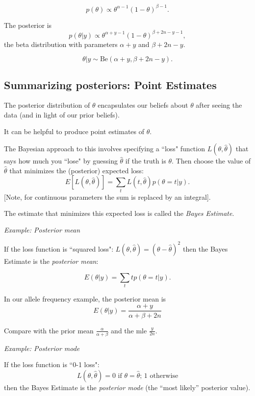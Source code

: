 $$p\left( \theta  \right) \propto \theta ^{\alpha  - 1} \left( {1 - \theta }
\right)^{\beta  - 1}.$$

The posterior is  
$$p\left( {\left. \theta  \right|y} \right) \propto \theta ^{\alpha  + y - 1}
\left( {1 - \theta } \right)^{\beta  + 2n - y - 1},$$
 the beta distribution with parameters $\alpha  + y$
 and $\beta  + 2n - y$.
 
 $$\theta | y \sim \text{Be}(\alpha+y, \beta + 2n -y).$$

\es\bs

 \subsection*{Summarizing posteriors: Point Estimates}

The posterior distribution of $\theta $ encapsulates our
beliefs about $\theta $ after seeing the data (and in light of our prior beliefs). 

It can be helpful to produce point estimates of $\theta$. 

The Bayesian approach to this involves specifying a ``loss" function
$L(\theta,\hat{\theta})$ that says how much you ``lose" by guessing
$\hat{\theta}$ if the truth is $\theta$. Then choose the value of $\hat{\theta}$ that
minimizes the (posterior) expected loss:
$$E[L(\theta,\hat{\theta})] = \sum_t L(t,\hat{\theta}) p(\theta= t | y).$$
[Note, for continuous parameters the sum is replaced by an integral].

The estimate that minimizes this expected loss is called the {\it Bayes Estimate}.
\es\bs

{\color{section0}\em Example: Posterior mean}

If the loss function is ``squared loss": $L(\theta,\hat{\theta}) = (\theta-\hat{\theta})^2$
then the Bayes Estimate is the {\em posterior mean}:

$$E( \theta |y ) = \sum_t t p(\theta=t  |y).$$

In our allele frequency example, the posterior mean is
$$E\left( {\left. \theta  \right|y} \right) = \frac{{\alpha  + y}}{{\alpha  + \beta  + 2n}}$$

Compare with the prior mean $\frac{\alpha }{{\alpha  + \beta }}$
 and the mle $\frac{y}{2n}.$
    \es\bs

{\color{section0}\em Example: Posterior mode}

If the loss function is ``0-1 loss": 
$$L(\theta,\hat{\theta}) = 0 \text{ if $\theta = \hat{\theta}$; 1 otherwise}$$
then the Bayes Estimate is the {\em posterior mode} (the ``most
likely'' posterior value).

